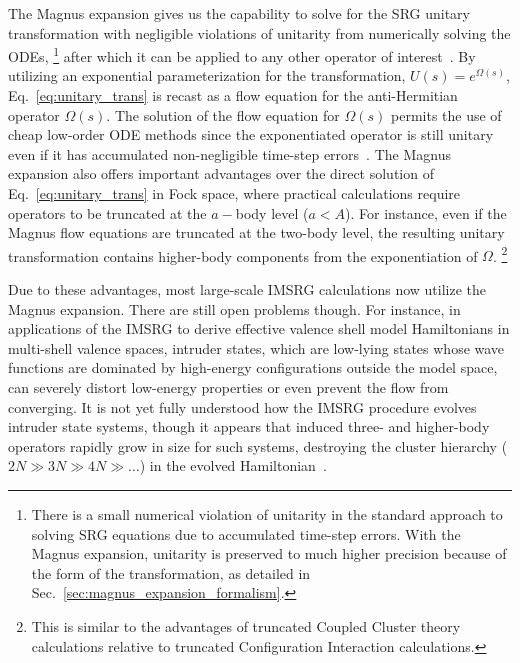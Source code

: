 \documentclass[10pt,aps,prc,floatfix,twocolumn,nofootinbib]{revtex4-1}
\begin{document}
The Magnus expansion gives us the capability to solve for the SRG unitary transformation with negligible violations of unitarity from numerically solving the ODEs,%
\footnote{There is a small numerical violation of unitarity in the standard approach to solving SRG equations due to accumulated time-step errors. With the Magnus expansion, unitarity is preserved to much higher precision because of the form of the transformation, as detailed in Sec.~\ref{sec:magnus_expansion_formalism}.}
after which it can be applied to any other operator of interest~\cite{Morris:2015yna}.
By utilizing an exponential parameterization for the transformation, $U(s)=e^{\Omega(s)}$, Eq.~\eqref{eq:unitary_trans} is recast as a flow equation for the anti-Hermitian operator $\Omega(s)$.
The solution of the flow equation for $\Omega(s)$ permits the use of cheap low-order ODE methods since the exponentiated operator is still unitary even if it has accumulated non-negligible time-step errors~\cite{Morris:2015yna}.
The Magnus expansion also offers important advantages over the direct solution of Eq.~\eqref{eq:unitary_trans} in Fock space, where practical calculations require operators to be truncated at the $a-$body level ($a<A$).
For instance, even if the Magnus flow equations are truncated at the two-body level, the resulting unitary transformation contains higher-body components from the exponentiation of $\Omega$.%
\footnote{This is similar to the advantages of truncated Coupled Cluster theory calculations relative to truncated Configuration Interaction calculations.} 


Due to these advantages, most large-scale IMSRG calculations now utilize the Magnus expansion.
There are still open problems though.
For instance, in applications of the IMSRG to derive effective valence shell model Hamiltonians in multi-shell valence spaces, intruder states, which are low-lying states whose wave functions are dominated by high-energy configurations outside the model space, can severely distort low-energy properties or even prevent the flow from converging.
It is not yet fully understood how the IMSRG procedure evolves intruder state systems, though it appears that induced three- and higher-body operators rapidly grow in size for such systems, destroying the cluster hierarchy ($2N \gg 3N \gg 4N \gg \ldots$) in the evolved Hamiltonian~\cite{Stroberg:2019mxo}.
\end{document}
